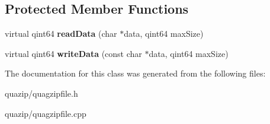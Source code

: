 \subsection*{Protected Member Functions}
\begin{DoxyCompactItemize}
\item 
virtual qint64 {\bfseries readData} (char $\ast$data, qint64 maxSize)\label{classQuaGzipFile_a9eab41b46367e63e0c269c42ca883d82}

\item 
virtual qint64 {\bfseries writeData} (const char $\ast$data, qint64 maxSize)\label{classQuaGzipFile_a6dd09d41d8a51c96b0f2134eff37f676}

\end{DoxyCompactItemize}


The documentation for this class was generated from the following files:\begin{DoxyCompactItemize}
\item 
quazip/quagzipfile.h\item 
quazip/quagzipfile.cpp\end{DoxyCompactItemize}

